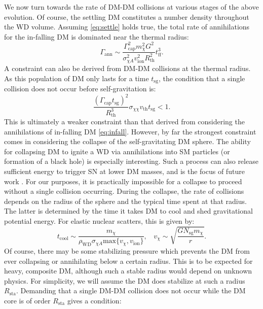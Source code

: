 We now turn towards the rate of DM-DM collisions at various stages of the above evolution. 
Of course, the settling DM constitutes a number density throughout the WD volume.
Assuming \eqref{eq:settle} holds true, the total rate of annihilations for the in-falling DM is dominated near the thermal radius:
\begin{equation}
\label{eq:infall}
\Gamma_\text{ann} \sim \frac{\Gamma_\text{cap}^2 m_\chi^2 G^2}{\sigma_{\chi A}^2 v_\text{ion}^2 R_\text{th}^2} t_\text{ff}^3. 
\end{equation}
A constraint can also be derived from DM-DM collisions at the thermal radius. 
As this population of DM only lasts for a time $t_\text{sg}$, the condition that a single collision does not occur before self-gravitation is:
\begin{equation}
\frac{(\Gamma_\text{cap} t_\text{sg})^2}{R_\text{th}^3} \sigma_{\chi \chi} v_\text{th} t_\text{sg} < 1.
\end{equation}
This is ultimately a weaker constraint than that derived from considering the annihilations of in-falling DM \eqref{eq:infall}.
However, by far the strongest constraint comes in considering the collapse of the self-gravitating DM sphere. 
The ability for collapsing DM to ignite a WD via annihilations into SM particles (or formation of a black hole) is especially interesting. 
Such a process can also release sufficient energy to trigger SN at lower DM masses, and is the focus of future work \cite{us}.
For our purposes, it is practically impossible for a collapse to proceed without a single collision occurring.
During the collapse, the rate of collisions depends on the radius of the sphere and the typical time spent at that radius.
The latter is determined by the time it takes DM to cool and shed gravitational potential energy.
For elastic nuclear scatters, this is given by:
\begin{equation}
t_\text{cool} \sim \frac{m_\chi}{\rho_\text{WD} \sigma_{\chi A} \text{max}\{v_\chi, v_\text{ion}\}}, ~~~~ v_\chi \sim \sqrt{\frac{G N_\text{sg} m_\chi}{r}}. 
\end{equation}
Of course, there may be some stabilizing pressure which prevents the DM from ever collapsing or annihilating below a certain radius.
This is to be expected for heavy, composite DM, although such a stable radius would depend on unknown physics. 
For simplicity, we will assume the DM does stabilize at such a radius $R_\text{sta}$.
Demanding that a single DM-DM collision does not occur while the DM core is of order $R_\text{sta}$ gives a condition:
